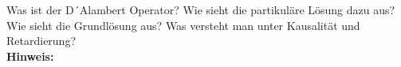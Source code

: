 \begin{question}[section=5,subsection=51,name={Inhomogene Wellengleichung},difficulty=8,type=mdl,mode=exm,tags={}]
	Was ist der D´Alambert Operator? Wie sieht die partikuläre Lösung dazu aus? Wie sieht die Grundlösung aus? Was versteht man unter Kausalität und Retardierung?
	\\ \textbf{Hinweis:}\\
	
\end{question}
\begin{solution}
	
\end{solution}